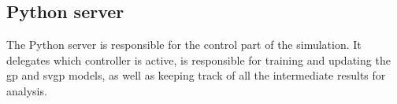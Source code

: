 \subsection{Python server}

The Python server is responsible for the control part of the simulation. It
delegates which controller is active, is responsible for training and updating
the \acrshort{gp} and \acrshort{svgp} models, as well as keeping track of all
the intermediate results for analysis.


\clearpage

